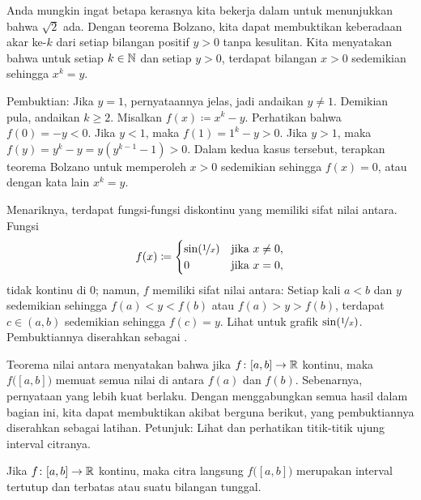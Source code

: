 \begin{example}
Anda mungkin ingat betapa kerasnya kita bekerja
dalam 
untuk menunjukkan bahwa $\sqrt{2}$ ada.
Dengan teorema Bolzano, kita dapat membuktikan keberadaan akar ke-$k$ dari setiap bilangan positif
$y > 0$ tanpa kesulitan.
Kita menyatakan bahwa untuk setiap $k \in {\mathbb{N}}$ dan setiap $y > 0$,
terdapat bilangan $x > 0$ sedemikian sehingga $x^k = y$.

Pembuktian: Jika $y=1$, pernyataannya jelas, jadi andaikan $y\neq 1$.
Demikian pula, andaikan $k \geq 2$.
Misalkan $f(x) \coloneqq x^k - y$.  Perhatikan bahwa $f(0) = -y < 0$.
Jika $y < 1$, maka $f(1) = 1^k -y > 0$.  Jika $y > 1$,
maka $f(y) = y^k-y = y(y^{k-1}-1) > 0$.
Dalam kedua kasus tersebut, terapkan teorema Bolzano untuk memperoleh $x > 0$ sedemikian sehingga $f(x) = 0$,
atau dengan kata lain $x^k = y$.
\end{example}

\begin{example}
Menariknya, terdapat fungsi-fungsi diskontinu yang memiliki
sifat nilai antara.
Fungsi
\begin{equation*}
f(x) \coloneqq
\begin{cases}
\sin(\nicefrac{1}{x}) & \text{jika } x \neq 0, \\
0 & \text{jika } x=0,
\end{cases}
\end{equation*}
tidak kontinu di $0$; namun, $f$ memiliki sifat nilai antara:
Setiap kali $a < b$ dan $y$ sedemikian sehingga $f(a) < y < f(b)$
atau $f(a) > y > f(b)$,
terdapat $c \in (a,b)$ sedemikian sehingga $f(c) = y$.
Lihat  untuk grafik $\sin(\nicefrac{1}{x})$.
Pembuktiannya diserahkan sebagai .
\end{example}

Teorema nilai antara menyatakan bahwa jika $f \colon [a,b] \to {\mathbb{R}}$
kontinu, maka $f\bigl([a,b]\bigr)$ memuat semua nilai di antara $f(a)$ dan
$f(b)$.  Sebenarnya, pernyataan yang lebih kuat berlaku.  Dengan menggabungkan semua hasil dalam bagian ini,
kita dapat membuktikan akibat berguna berikut, yang pembuktiannya diserahkan sebagai latihan.
Petunjuk: Lihat  dan perhatikan titik-titik ujung
interval citranya.

\begin{cor} \label{cor:imageofinterval}
Jika $f \colon [a,b] \to {\mathbb{R}}$ kontinu, maka citra langsung
$f\bigl([a,b]\bigr)$
merupakan interval tertutup dan terbatas atau suatu bilangan tunggal.
\end{cor}

